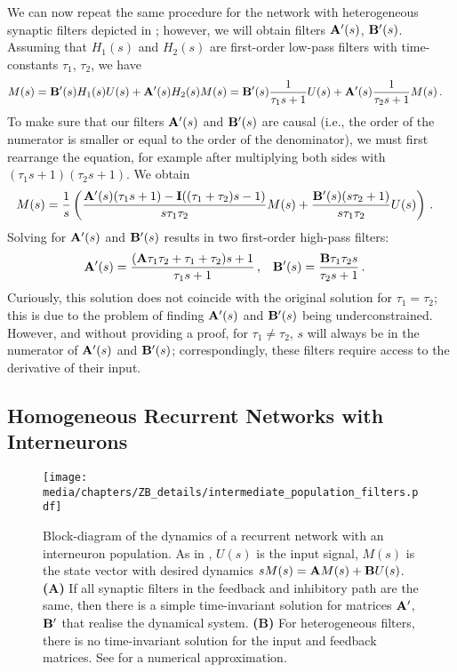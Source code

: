 We can now repeat the same procedure for the network with heterogeneous synaptic filters depicted in ; however, we will obtain filters $\mathbf{A}'(s)$, $\mathbf{B}'(s)$.
Assuming that $H_1(s)$ and $H_2(s)$ are first-order low-pass filters with time-constants $\tau_1$, $\tau_2$, we have
\begin{align*}
	M(s) &= \mathbf{B}'(s) H_1(s) U(s) + \mathbf{A}'(s) H_2(s) M(s) = \mathbf{B}'(s) \frac{1}{\tau_1 s + 1} U(s) + \mathbf{A}'(s) \frac{1}{\tau_2 s + 1} M(s) \,.
	\label{eqn:hetero_dyn}
\end{align*}
To make sure that our filters $\mathbf{A}'(s)$ and $\mathbf{B}'(s)$ are causal (i.e., the order of the numerator is smaller or equal to the order of the denominator), we must first rearrange the equation, for example after multiplying both sides with $(\tau_1 s + 1) (\tau_2 s + 1)$.
We obtain
\begin{align*}
	M(s) &= \frac{1}{s} \left(
		  \frac{ \mathbf{A}'(s) (\tau_1 s + 1) - \mathbf{I} ((\tau_1 + \tau_2) s - 1 )}{s \tau_1 \tau_2} M(s)
		+ \frac{\mathbf{B}'(s) (s \tau_2 + 1)}{s \tau_1 \tau_2} U(s)
	\right) \,.
\end{align*}
Solving for $\mathbf{A}'(s)$ and $\mathbf{B}'(s)$ results in two first-order high-pass filters:
\begin{align*}
	\mathbf{A}'(s) &= \frac{(\mathbf{A} \tau_1 \tau_2 + \tau_1 + \tau_2) s + 1}{\tau_1 s + 1} \,, &
	\mathbf{B}'(s) &= \frac{\mathbf{B} \tau_1 \tau_2 s}{\tau_2 s + 1} \,.
\end{align*}
Curiously, this solution does not coincide with the original \NEF solution for $\tau_1 = \tau_2$; this is due to the problem of finding $\mathbf{A}'(s)$ and $\mathbf{B}'(s)$ being underconstrained.
However, and without providing a proof, for $\tau_1 \neq \tau_2$, $s$ will always be in the numerator of $\mathbf{A}'(s)$ and $\mathbf{B}'(s)$; correspondingly, these filters require access to the derivative of their input.

\subsection{Homogeneous Recurrent Networks with Interneurons}
\label{app:granule_golgi_dynamics}

\begin{figure}
	\centering
	\texttt{[image: media/chapters/ZB\_details/intermediate\_population\_filters.pdf]}
	{\label{fig:intermediate_population_filters_a}}%
	{\label{fig:intermediate_population_filters_b}}%
	\caption[Block-diagram of recurrent networks with an interneuron population]{Block-diagram of the dynamics of a recurrent network with an interneuron population. As in , $U(s)$ is the input signal, $M(s)$ is the state vector with desired dynamics $s M(s) = \mathbf{A} M(s) + \mathbf{B} U(s)$.
	\textbf{(A)} If all synaptic filters in the feedback and inhibitory path are the same, then there is a simple time-invariant solution for matrices $\mathbf{A}'$, $\mathbf{B}'$ that realise the dynamical system.
	\textbf{(B)} For heterogeneous filters, there is no time-invariant solution for the input and feedback matrices. See  for a numerical approximation.}
\end{figure}


